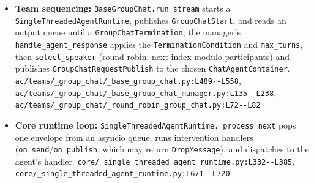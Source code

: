 \begin{itemize}
\item \textbf{Team sequencing:} \texttt{BaseGroupChat.\allowbreak{}run\_\allowbreak{}stream} starts a \texttt{SingleThreadedAgentRuntime}, publishes \texttt{GroupChatStart}, and reads an output queue until a \texttt{GroupChatTermination}; the manager's \texttt{handle\_\allowbreak{}agent\_\allowbreak{}response} applies the \texttt{TerminationCondition} and \texttt{max\_\allowbreak{}turns}, then \texttt{select\_\allowbreak{}speaker} (round-robin: next index modulo participants) and publishes \texttt{GroupChatRequestPublish} to the chosen \texttt{ChatAgentContainer}. \texttt{ac/\allowbreak{}teams/\allowbreak{}\_\allowbreak{}group\_\allowbreak{}chat/\allowbreak{}\_\allowbreak{}base\_\allowbreak{}group\_\allowbreak{}chat.\allowbreak{}py:\allowbreak{}L489-\allowbreak{}-\allowbreak{}L558}, \texttt{ac/\allowbreak{}teams/\allowbreak{}\_\allowbreak{}group\_\allowbreak{}chat/\allowbreak{}\_\allowbreak{}base\_\allowbreak{}group\_\allowbreak{}chat\_\allowbreak{}manager.\allowbreak{}py:\allowbreak{}L135-\allowbreak{}-\allowbreak{}L238}, \texttt{ac/\allowbreak{}teams/\allowbreak{}\_\allowbreak{}group\_\allowbreak{}chat/\allowbreak{}\_\allowbreak{}round\_\allowbreak{}robin\_\allowbreak{}group\_\allowbreak{}chat.\allowbreak{}py:\allowbreak{}L72-\allowbreak{}-\allowbreak{}L82}
\item \textbf{Core runtime loop:} \texttt{SingleThreadedAgentRuntime.\allowbreak{}\_\allowbreak{}process\_\allowbreak{}next} pops one envelope from an asyncio queue, runs intervention handlers (\texttt{on\_\allowbreak{}send}/\texttt{on\_\allowbreak{}publish}, which may return \texttt{DropMessage}), and dispatches to the agent's handler. \texttt{core/\allowbreak{}\_\allowbreak{}single\_\allowbreak{}threaded\_\allowbreak{}agent\_\allowbreak{}runtime.\allowbreak{}py:\allowbreak{}L332-\allowbreak{}-\allowbreak{}L385}, \texttt{core/\allowbreak{}\_\allowbreak{}single\_\allowbreak{}threaded\_\allowbreak{}agent\_\allowbreak{}runtime.\allowbreak{}py:\allowbreak{}L671-\allowbreak{}-\allowbreak{}L720}
\end{itemize}

